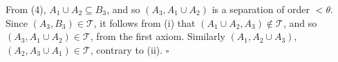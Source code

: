 From (4), $A_1 \cup A_2 \subseteq B_3$, and so $(A_3, A_1 \cup A_2)$ is a separation of order $< \theta$. Since $(A_3, B_3) \in \mathscr{T}$, it follows from (i) that $(A_1 \cup A_2, A_3) \notin \mathscr{T}$, and so $(A_3, A_1 \cup A_2) \in \mathscr{T}$, from the first axiom. Similarly $(A_1, A_2 \cup A_3)$, $(A_2, A_3 \cup A_1) \in \mathscr{T}$, contrary to (ii). $\square$

